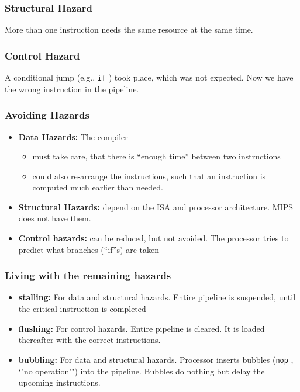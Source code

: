 \documentclass[german]{latex4ei/latex4ei_sheet}
\begin{document}
{\subsubsection{Structural Hazard}
More than one instruction needs the same resource at the same time.

\subsubsection{Control Hazard}
A conditional jump (e.g., \texttt{if} ) took place, which was not expected. Now we have the wrong instruction in the pipeline.

\subsubsection{Avoiding Hazards}
\begin{itemize}
\item \textbf{Data Hazards:} The compiler
\begin{itemize}
\item must take care, that there is "`enough time"' between two instructions
\item could also re-arrange the instructions, such that an instruction is computed much earlier than needed.
\end{itemize}
\item \textbf{Structural Hazards:} depend on the ISA and processor architecture. MIPS does not have them.
\item \textbf{Control hazards:} can be reduced, but not avoided. The processor tries to predict what branches ("`if"'s) are taken
\end{itemize}

\subsubsection{Living with the remaining hazards}
\begin{itemize}
\item \textbf{stalling:} For data and structural hazards. Entire pipeline is suspended, until the critical instruction is completed
\item \textbf{flushing:} For control hazards. Entire pipeline is cleared. It is loaded thereafter with the correct instructions.
\item \textbf{bubbling:} For data and structural hazards. Processor inserts bubbles (\texttt{nop} , `"no operation'") into the pipeline. Bubbles do nothing but delay the upcoming instructions.
\end{itemize}
}
\end{document}
